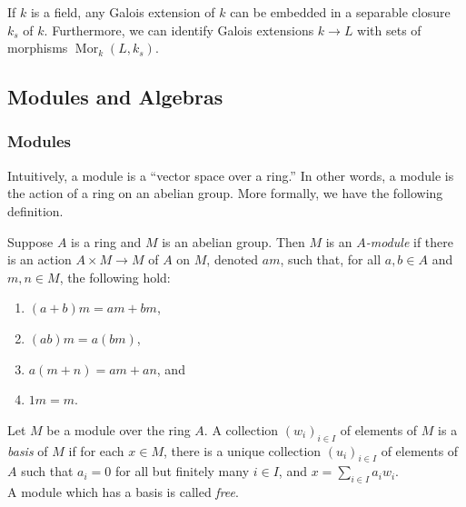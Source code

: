\documentclass[11pt,openany]{book} %
\newcommand{\Mor}{\operatorname{Mor}}
\begin{document}
\begin{lemma}
If $k$ is a field, any Galois extension of $k$ can be embedded in a separable closure $k_s$ of $k$. Furthermore, we can identify Galois extensions $k \to L$ with sets of morphisms $\Mor_k(L, k_s)$.
\end{lemma}


\subsection{Modules and Algebras}

\subsubsection{Modules}

Intuitively, a module is a ``vector space over a ring.'' In other words, a module is the action of a ring on an abelian group. More formally, we have the following definition.

\begin{definition}
Suppose $A$ is a ring and $M$ is an abelian group. Then $M$ is an \emph{$A$-module} if there is an action $A \times M \to M$ of $A$ on $M$, denoted $am$, such that, for all $a,b \in A$ and $m,n \in M$, the following hold:
\begin{enumerate}
	\item $(a+b)m = am + bm$,
    \item $(ab)m = a(bm)$,
    \item $a(m+n) = am + an$, and
    \item $1m = m$.
\end{enumerate}
\end{definition}

\begin{definition}
Let $M$ be a module over the ring $A$. A collection $(w_i)_{i \in I}$ of elements of $M$ is a \emph{basis} of $M$ if for each $x \in M$, there is a unique collection $(u_i)_{i \in I}$ of elements of $A$ such that $a_i = 0$ for all but finitely many $i \in I$, and $x = \sum_{i \in I} a_iw_i$.\\

A module which has a basis is called \emph{free}.
\end{definition}
\end{document}
